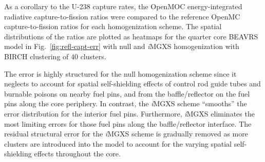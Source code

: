 \documentclass[12pt,twoside]{mitthesis-exec}
\begin{document}
As a corollary to the U-238 capture rates, the OpenMOC energy-integrated radiative capture-to-fission ratios were compared to the reference OpenMC capture-to-fission ratios for each homogenization scheme. The spatial distributions of the ratios are plotted as heatmaps for the quarter core BEAVRS model in Fig.~\ref{fig:refl-capt-err} with null and \textit{i}MGXS homogenization with BIRCH clustering of 40 clusters. 

The error is highly structured for the null homogenization scheme since it neglects to account for spatial self-shielding effects of control rod guide tubes and burnable poisons on nearby fuel pins, and from the baffle/reflector on the fuel pins along the core periphery. In contrast, the \textit{i}MGXS scheme ``smooths'' the error distribution for the interior fuel pins. Furthermore, \textit{i}MGXS eliminates the most limiting errors for those fuel pins along the baffle/reflector interface. The residual structural error for the \textit{i}MGXS scheme is gradually removed as more clusters are introduced into the model to account for the varying spatial self-shielding effects throughout the core.
\end{document}
